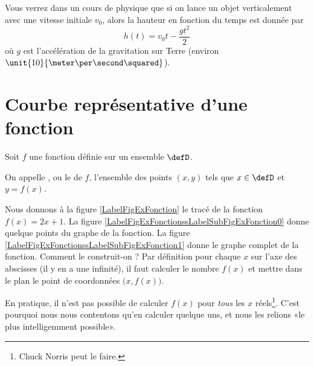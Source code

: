 \begin{example}
    Vous verrez dans un cours de physique que si on lance un objet verticalement avec une vitesse initiale \( v_0\), alors la hauteur en fonction du temps est donnée par
    \begin{equation}
        h(t)=v_0t-\frac{ gt^2 }{2}
    \end{equation}
    où \( g\) est l'accélération de la gravitation sur Terre (environ \( \unit{10}{\meter\per\second\squared}\)).
\end{example}

\section{Courbe représentative d'une fonction}

Soit $f$ une fonction définie sur un ensemble $\defD$.

\begin{definition}
    On appelle , ou le  de $f$, l'ensemble des points $(x,y)$ tels que $x\in\defD$ et $y=f(x)$.
\end{definition}

\newcommand{\CaptionFigExFonction}{Comment tracer la fonction \( f(x)=2x+1\) ?}


Nous donnons à la figure \ref{LabelFigExFonction} le tracé de la fonction \( f(x)=2x+1\). La figure \ref{LabelFigExFonctionssLabelSubFigExFonction0} donne quelque points du graphe de la fonction. La figure \ref{LabelFigExFonctionssLabelSubFigExFonction1} donne le graphe complet de la fonction. Comment le construit-on ? Par définition pour chaque \( x\) sur l'axe des abscisses (il y en a une infinité), il faut calculer le nombre \( f(x)\) et mettre dans le plan le point de coordonnées \( \big( x,f(x) \big)\).

En pratique, il n'est pas possible de calculer \( f(x)\) pour \emph{tous} les \( x\) réels\footnote{Chuck Norris peut le faire.}. C'est pourquoi nous nous contentons qu'en calculer quelque uns, et nous les relions «le plus intelligemment possible».

